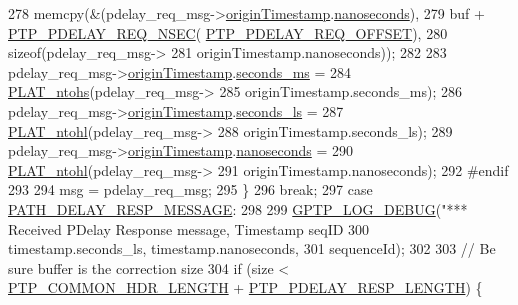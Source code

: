 \begin{DoxyCode}
{{{{{{278             memcpy(&(pdelay\_req\_msg->\hyperlink{class_p_t_p_message_path_delay_req_a57a4bfcce938833de582c2ed5138aa3b}{originTimestamp}.\hyperlink{class_timestamp_a78ae11d98fcfe738239d0a853d82c84a}{nanoseconds}),
279                    buf + \hyperlink{avbts__message_8hpp_ae113dfd103ed7c7eeea9adecb0a40633}{PTP\_PDELAY\_REQ\_NSEC}(
      \hyperlink{avbts__message_8hpp_a11afdce162945d7ec2f0083eecbd53bd}{PTP\_PDELAY\_REQ\_OFFSET}),
280                    \textcolor{keyword}{sizeof}(pdelay\_req\_msg->
281                       originTimestamp.nanoseconds));
282 
283             pdelay\_req\_msg->\hyperlink{class_p_t_p_message_path_delay_req_a57a4bfcce938833de582c2ed5138aa3b}{originTimestamp}.\hyperlink{class_timestamp_a5d98378d782519e6f9c17db70f1620f0}{seconds\_ms} =
284                 \hyperlink{linux_2src_2platform_8cpp_a6b8f3e7b87b66fa774a07ddc67f883a7}{PLAT\_ntohs}(pdelay\_req\_msg->
285                        originTimestamp.seconds\_ms);
286             pdelay\_req\_msg->\hyperlink{class_p_t_p_message_path_delay_req_a57a4bfcce938833de582c2ed5138aa3b}{originTimestamp}.\hyperlink{class_timestamp_a2bf200e58cd268d8b86cf93c51500a44}{seconds\_ls} =
287                 \hyperlink{linux_2src_2platform_8cpp_ad335681c3444e0406899693a6f782173}{PLAT\_ntohl}(pdelay\_req\_msg->
288                        originTimestamp.seconds\_ls);
289             pdelay\_req\_msg->\hyperlink{class_p_t_p_message_path_delay_req_a57a4bfcce938833de582c2ed5138aa3b}{originTimestamp}.\hyperlink{class_timestamp_a78ae11d98fcfe738239d0a853d82c84a}{nanoseconds} =
290                 \hyperlink{linux_2src_2platform_8cpp_ad335681c3444e0406899693a6f782173}{PLAT\_ntohl}(pdelay\_req\_msg->
291                        originTimestamp.nanoseconds);
292 \textcolor{preprocessor}{#endif}
293 
294             msg = pdelay\_req\_msg;
295         \}
296         \textcolor{keywordflow}{break};
297     \textcolor{keywordflow}{case} \hyperlink{avbts__message_8hpp_ac6606ebe91c8ac66a2c314c79f5ab013a34726fb5c993d42c4928bfb41941f22c}{PATH\_DELAY\_RESP\_MESSAGE}:
298 
299         \hyperlink{gptp__log_8hpp_ae4c6efe7c9cf6d7d3bbd28a0fd087d61}{GPTP\_LOG\_DEBUG}(\textcolor{stringliteral}{"*** Received PDelay Response message, Timestamp %
       seqID %
300                timestamp.seconds\_ls, timestamp.nanoseconds,
301                sequenceId);
302 
303         \textcolor{comment}{// Be sure buffer is the correction size}
304         \textcolor{keywordflow}{if} (size < \hyperlink{avbts__message_8hpp_a8ec4d965b7b1e83844f1c17f12e9b8e4}{PTP\_COMMON\_HDR\_LENGTH} + 
      \hyperlink{avbts__message_8hpp_ac0ec5cb983cc66ad538676830d3fb8a4}{PTP\_PDELAY\_RESP\_LENGTH}) \{
}}}}}}}
\end{DoxyCode}
